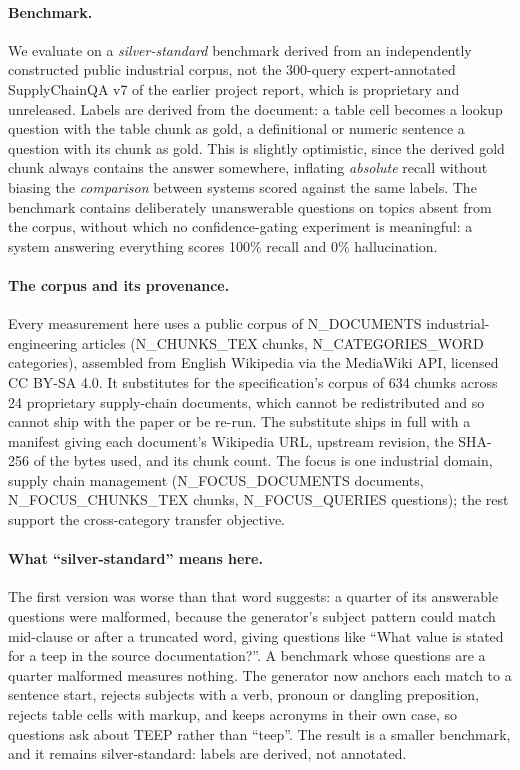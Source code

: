 \documentclass[conference]{IEEEtran}
\begin{document}
\paragraph{Benchmark.} We evaluate on a \emph{silver-standard} benchmark
derived from an independently constructed public industrial corpus, not the
300-query expert-annotated SupplyChainQA v7 of the earlier project report,
which is proprietary and unreleased. Labels are derived from the document: a
table cell becomes a lookup question with the table chunk as gold, a
definitional or numeric sentence a question with its chunk as gold. This is
slightly optimistic, since the derived gold chunk always contains the answer
somewhere, inflating \emph{absolute} recall without biasing the
\emph{comparison} between systems scored against the same labels. The
benchmark contains deliberately unanswerable questions on topics absent from
the corpus, without which no confidence-gating experiment is meaningful: a
system answering everything scores 100\% recall and 0\% hallucination.

\paragraph{The corpus and its provenance.} Every measurement here uses a public
corpus of {{N_DOCUMENTS}} industrial-engineering articles
({{N_CHUNKS_TEX}} chunks, {{N_CATEGORIES_WORD}} categories), assembled from
English Wikipedia via the MediaWiki API, licensed CC BY-SA 4.0. It
substitutes for the specification's corpus of 634 chunks across 24
proprietary supply-chain documents, which cannot be redistributed and so
cannot ship with the paper or be re-run. The substitute ships in full with a
manifest giving each document's Wikipedia URL, upstream revision, the SHA-256
of the bytes used, and its chunk count. The focus is one industrial domain,
supply chain management ({{N_FOCUS_DOCUMENTS}} documents,
{{N_FOCUS_CHUNKS_TEX}} chunks, {{N_FOCUS_QUERIES}} questions); the rest
support the cross-category transfer objective.

\paragraph{What ``silver-standard'' means here.} The first version was worse
than that word suggests: a quarter of its answerable questions were malformed,
because the generator's subject pattern could match mid-clause or after a
truncated word, giving questions like
``What value is stated for a teep in the source documentation?''. A benchmark
whose questions are a quarter malformed measures nothing. The generator now
anchors each match to a sentence start, rejects subjects with a verb, pronoun
or dangling preposition, rejects table cells with markup, and keeps acronyms
in their own case, so questions ask about TEEP rather than ``teep''. The result
is a smaller benchmark, and it remains silver-standard: labels are derived,
not annotated.
\end{document}
